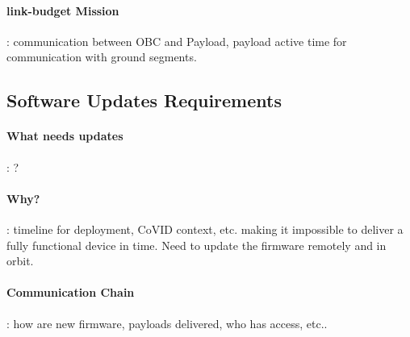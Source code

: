 \paragraph*{link-budget Mission}: communication between OBC and Payload, payload
active time for communication with ground segments.

\subsection{Software Updates Requirements}
\paragraph*{What needs updates}: ?
\paragraph*{Why?}: timeline for deployment, CoVID context, etc. making it impossible
to deliver a fully functional device in time. Need to update the firmware remotely
and in orbit.
\paragraph*{Communication Chain}: how are new firmware, payloads delivered,
who has access, etc..

